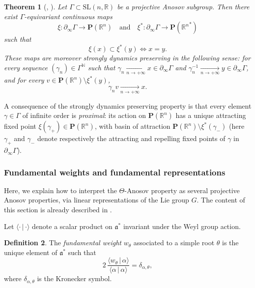 \documentclass[11pt]{article}
\numberwithin{equation}{section}
\newcommand{\quand}{\quad\text{and}\quad}
\newtheorem{theo}{Theorem}[section]
\theoremstyle{definition}
\newtheorem{defi}[theo]{Definition}
\newcommand{\proj}{\mathbf{P}}
\newcommand{\R}{\mathbb{R}}
\newcommand{\N}{\mathbb{N}}
\newcommand{\SL}{\mathrm{SL}}
\newcommand{\fa}{\mathfrak{a}}
\newcommand{\scal}[2]{\langle #1\, |\, #2 \rangle }
\let\G\Gamma
\let\g\gamma
\begin{document}
\begin{theo}[\cite{labourie2006anosov}, \cite{kapovich2017anosov}] \label{theo - AnosovLimitMaps}
Let $\G\subset \SL(n,\R)$ be a projective Anosov subgroup. Then there exist $\G$-equivariant continuous maps\vspace*{-3pt}
\[
\xi: \partial_\infty \Gamma \to \proj(\R^n)\quand \xi^*: \partial_\infty \Gamma \to \proj({\R^n}^*)
\]
such that
\[\xi(x)\subset \xi^*(y) \iff x = y.\]
These maps are moreover \emph{strongly dynamics preserving} in the following sense: for every sequence $(\g_n)\in \Gamma^\N$ such that $\g_n\underset{n\to +\infty}{\longrightarrow} x \in \partial_\infty \Gamma$ and $\g_n^{-1}\underset{n\to +\infty}{\longrightarrow} y \in \partial_\infty \Gamma$, and for every $v\in \proj(\R^n) \setminus \xi^*(y)$,\vspace*{-3pt}
\[\g_n v \underset{n\to +\infty}{\longrightarrow} x.\]
\end{theo}
A consequence of the strongly dynamics preserving property is that every element $\g\in \G$ of infinite order is \emph{proximal}: its action on $\proj(\R^n)$ has a unique attracting fixed point $\xi(\g_+)\in \proj(\R^n)$, with basin of attraction $\proj(\R^n) \setminus \xi^*(\g_-)$ (here $\g_+$ and $\g_-$ denote respectively the attracting and repelling fixed points of $\g$ in $\partial_\infty \Gamma$).

\subsubsection{Fundamental weights and fundamental representations} \label{subsec - fundamental weights and fundamental representations}
Here, we explain how to interpret the $\Theta$-Anosov property as several projective Anosov properties, via linear representations of the Lie group $G$. The content of this section is already described in \cite[\S 3]{gueritaud20017anosov}.

Let $\scal{\cdot}{\cdot}$ denote a scalar product on $\fa^*$ invariant under the Weyl group action.
\begin{defi}
The \emph{fundamental weight} $w_\theta$ associated to a simple root $\theta$ is the unique element of $\fa^*$ such that\vspace*{-3pt}
\[2\,\frac{\scal{w_\theta}{\alpha}}{\scal{\alpha}{\alpha}}= \delta_{\alpha,\theta},\]
where $\delta_{\alpha,\theta}$ is the Kronecker symbol.
\end{defi}
\end{document}
